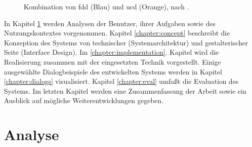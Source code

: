 \documentclass[11pt,        %
  english,ngerman,          %
  paper=a4,                 %
  captions=tablesignature,  %
  listof=numbered,          %
  bibliography=totoc,       %
  headings=small,           %
  headinclude=false,        %
  footinclude=false,        %
  parskip=half-,            %
  oneside,                  %
  BCOR=15mm,                 %
  DIV=12                    %
  ]{scrbook}                %
\begin{document}
\begin{figure}[htbp]
\begin{center}
\end{center}
\caption[Kombination von FDD und UCD, nach \protect\cite{roenspiess-2009-teaco}.]%
  {Kombination von \protect\gls{fdd} (Blau) und \protect\gls{ucd} (Orange), nach \protect\cite{roenspiess-2009-teaco}.}
\label{fig:fdducd}
\end{figure}


In Kapitel \ref{chapter:analysis} werden Analysen der Benutzer, ihrer Aufgaben sowie des Nutzungskontextes vorgenommen. Kapitel \ref{chapter:concept} beschreibt die Konzeption des Systems von technischer (Systemarchitektur) und gestalterischer Seite (Interface Design). Im \ref{chapter:implementation}. Kapitel wird die Realisierung zusammen mit der eingesetzten Technik vorgestellt. Einige ausgewählte Dialogbeispiele des entwickelten Systems werden in Kapitel \ref{chapter:dialogs} visualisiert. Kapitel \ref{chapter:eval} umfaßt die Evaluation des Systems. Im letzten Kapitel werden eine Zusammenfassung der Arbeit sowie ein Ausblick auf mögliche Weiterentwicklungen gegeben.

\chapter{Analyse}\label{chapter:analysis}

\end{document}

